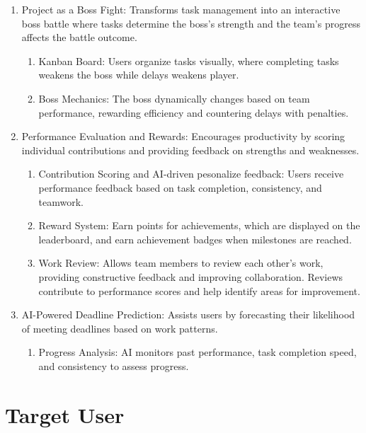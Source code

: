 \begin{enumerate}[leftmargin=80pt]  
    \item Project as a Boss Fight: Transforms task management into an interactive boss battle where tasks determine the boss’s strength and the team's progress affects the battle outcome.  
    \begin{enumerate}  
        \item Kanban Board: Users organize tasks visually, where completing tasks weakens the boss while delays weakens player.  
        \item Boss Mechanics: The boss dynamically changes based on team performance, rewarding efficiency and countering delays with penalties.  
    \end{enumerate}  

    \item Performance Evaluation and Rewards: Encourages productivity by scoring individual contributions and providing feedback on strengths and weaknesses.  
    \begin{enumerate}  
        \item Contribution Scoring and AI-driven pesonalize feedback: Users receive performance feedback based on task completion, consistency, and teamwork.  
        \item Reward System: Earn points for achievements, which are displayed on the leaderboard, and earn achievement badges when milestones are reached.  
        \item Work Review: Allows team members to review each other’s work, providing constructive feedback and improving collaboration. Reviews contribute to performance scores and help identify areas for improvement.  
    \end{enumerate}  

    \item AI-Powered Deadline Prediction: Assists users by forecasting their likelihood of meeting deadlines based on work patterns.  
    \begin{enumerate}  
        \item Progress Analysis: AI monitors past performance, task completion speed, and consistency to assess progress.  
    \end{enumerate}  
\end{enumerate}  


\section{Target User}  
\label{section:target-user}  

